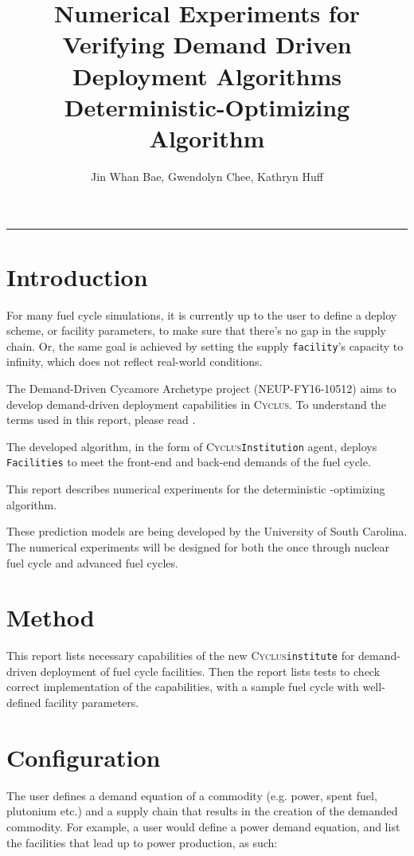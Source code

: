 \documentclass[11pt,letterpaper]{article}
\title{Numerical Experiments for Verifying Demand Driven Deployment Algorithms 
        \\ \vspace{0.5em} Deterministic-Optimizing Algorithm}
\author{Jin Whan Bae, Gwendolyn Chee, Kathryn Huff}
\newcommand{\Cyclus}{\textsc{Cyclus}\xspace}%
\begin{document}
	\maketitle
	\hrule

\section{Introduction}
For many fuel cycle simulations, it is currently up to the user to define
a deploy scheme, or facility parameters, to make sure that there's no gap
in the supply chain. Or, the same goal is achieved by setting the supply
\texttt{facility}'s capacity to infinity, which does not reflect real-world
conditions. 

The Demand-Driven Cycamore Archetype project (NEUP-FY16-10512) aims to develop demand-driven deployment capabilities
in \Cyclus. To understand the terms used in this report, please read \cite{huff_fundamental_2016}. 

The developed algorithm, in the form of \Cyclus \texttt{Institution}
agent, deploys \texttt{Facilities} to meet the front-end and back-end demands of the 
fuel cycle.

This report describes numerical experiments for the deterministic
-optimizing algorithm.

These prediction models are being developed by the University of South Carolina. The numerical experiments will be designed for both
 the once through nuclear fuel 
cycle and advanced fuel cycles. 

\section{Method}
This report lists necessary capabilities of the new \Cyclus \texttt{institute}
for demand-driven deployment of fuel cycle facilities. 
Then the report lists tests to check correct implementation of the capabilities,
with a sample fuel cycle with well-defined facility parameters.


\section{Configuration}
\label{sec:config}
The user defines a demand equation of a commodity (e.g. power, spent fuel, plutonium etc.)
and a supply chain that results in the creation of the demanded commodity.
For example, a user would define a power demand equation, and list
the facilities that lead up to power production, as such:
\end{document}
